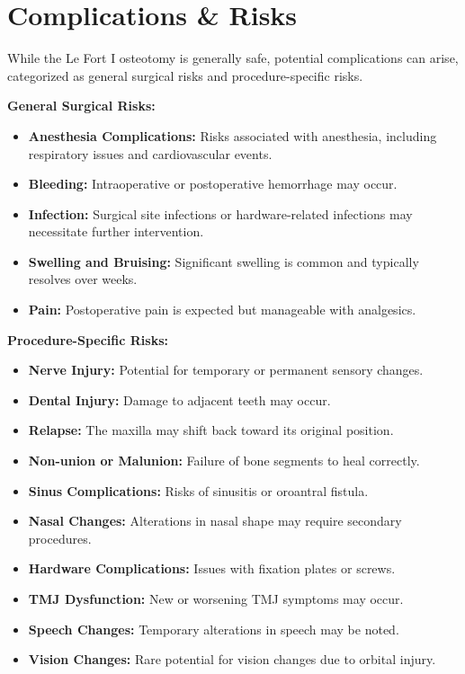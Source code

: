 \section*{Complications \& Risks}
While the Le Fort I osteotomy is generally safe, potential complications can arise, categorized as general surgical risks and procedure-specific risks.

\textbf{General Surgical Risks:}
\begin{itemize}
  \item \textbf{Anesthesia Complications:} Risks associated with anesthesia, including respiratory issues and cardiovascular events.
  \item \textbf{Bleeding:} Intraoperative or postoperative hemorrhage may occur.
  \item \textbf{Infection:} Surgical site infections or hardware-related infections may necessitate further intervention.
  \item \textbf{Swelling and Bruising:} Significant swelling is common and typically resolves over weeks.
  \item \textbf{Pain:} Postoperative pain is expected but manageable with analgesics.
\end{itemize}

\textbf{Procedure-Specific Risks:}
\begin{itemize}
  \item \textbf{Nerve Injury:} Potential for temporary or permanent sensory changes.
  \item \textbf{Dental Injury:} Damage to adjacent teeth may occur.
  \item \textbf{Relapse:} The maxilla may shift back toward its original position.
  \item \textbf{Non-union or Malunion:} Failure of bone segments to heal correctly.
  \item \textbf{Sinus Complications:} Risks of sinusitis or oroantral fistula.
  \item \textbf{Nasal Changes:} Alterations in nasal shape may require secondary procedures.
  \item \textbf{Hardware Complications:} Issues with fixation plates or screws.
  \item \textbf{TMJ Dysfunction:} New or worsening TMJ symptoms may occur.
  \item \textbf{Speech Changes:} Temporary alterations in speech may be noted.
  \item \textbf{Vision Changes:} Rare potential for vision changes due to orbital injury.
\end{itemize}

